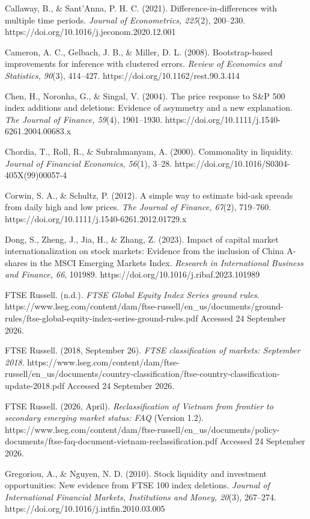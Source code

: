Callaway, B., \& Sant'Anna, P. H. C. (2021). Difference-in-differences
with multiple time periods. \emph{Journal of Econometrics, 225}(2),
200--230. https://doi.org/10.1016/j.jeconom.2020.12.001

Cameron, A. C., Gelbach, J. B., \& Miller, D. L. (2008). Bootstrap-based
improvements for inference with clustered errors. \emph{Review of
Economics and Statistics, 90}(3), 414--427.
https://doi.org/10.1162/rest.90.3.414

Chen, H., Noronha, G., \& Singal, V. (2004). The price response to S\&P
500 index additions and deletions: Evidence of asymmetry and a new
explanation. \emph{The Journal of Finance, 59}(4), 1901--1930.
https://doi.org/10.1111/j.1540-6261.2004.00683.x

Chordia, T., Roll, R., \& Subrahmanyam, A. (2000). Commonality in
liquidity. \emph{Journal of Financial Economics, 56}(1), 3--28.
https://doi.org/10.1016/S0304-405X(99)00057-4

Corwin, S. A., \& Schultz, P. (2012). A simple way to estimate bid-ask
spreads from daily high and low prices. \emph{The Journal of Finance,
67}(2), 719--760. https://doi.org/10.1111/j.1540-6261.2012.01729.x

Dong, S., Zheng, J., Jia, H., \& Zhang, Z. (2023). Impact of capital
market internationalization on stock markets: Evidence from the
inclusion of China A-shares in the MSCI Emerging Markets Index.
\emph{Research in International Business and Finance, 66}, 101989.
https://doi.org/10.1016/j.ribaf.2023.101989

FTSE Russell. (n.d.). \emph{FTSE Global Equity Index Series ground
rules}.
https://www.lseg.com/content/dam/ftse-russell/en\_us/documents/ground-rules/ftse-global-equity-index-series-ground-rules.pdf
Accessed 24 September 2026.

FTSE Russell. (2018, September 26). \emph{FTSE classification of
markets: September 2018}.
https://www.lseg.com/content/dam/ftse-russell/en\_us/documents/country-classification/ftse-country-classification-update-2018.pdf
Accessed 24 September 2026.

FTSE Russell. (2026, April). \emph{Reclassification of Vietnam from
frontier to secondary emerging market status: FAQ} (Version 1.2).
https://www.lseg.com/content/dam/ftse-russell/en\_us/documents/policy-documents/ftse-faq-document-vietnam-reclassification.pdf
Accessed 24 September 2026.

Gregoriou, A., \& Nguyen, N. D. (2010). Stock liquidity and investment
opportunities: New evidence from FTSE 100 index deletions. \emph{Journal
of International Financial Markets, Institutions and Money, 20}(3),
267--274. https://doi.org/10.1016/j.intfin.2010.03.005

